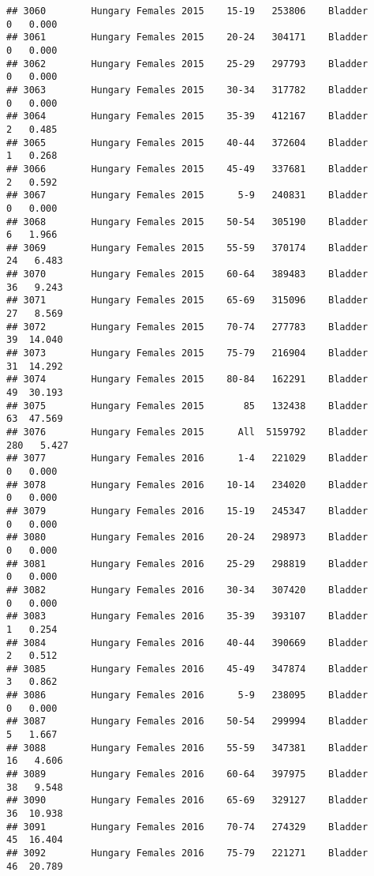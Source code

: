 \documentclass[
]{article}
\begin{document}
\begin{verbatim}
## 3060        Hungary Females 2015    15-19   253806    Bladder      0   0.000
## 3061        Hungary Females 2015    20-24   304171    Bladder      0   0.000
## 3062        Hungary Females 2015    25-29   297793    Bladder      0   0.000
## 3063        Hungary Females 2015    30-34   317782    Bladder      0   0.000
## 3064        Hungary Females 2015    35-39   412167    Bladder      2   0.485
## 3065        Hungary Females 2015    40-44   372604    Bladder      1   0.268
## 3066        Hungary Females 2015    45-49   337681    Bladder      2   0.592
## 3067        Hungary Females 2015      5-9   240831    Bladder      0   0.000
## 3068        Hungary Females 2015    50-54   305190    Bladder      6   1.966
## 3069        Hungary Females 2015    55-59   370174    Bladder     24   6.483
## 3070        Hungary Females 2015    60-64   389483    Bladder     36   9.243
## 3071        Hungary Females 2015    65-69   315096    Bladder     27   8.569
## 3072        Hungary Females 2015    70-74   277783    Bladder     39  14.040
## 3073        Hungary Females 2015    75-79   216904    Bladder     31  14.292
## 3074        Hungary Females 2015    80-84   162291    Bladder     49  30.193
## 3075        Hungary Females 2015       85   132438    Bladder     63  47.569
## 3076        Hungary Females 2015      All  5159792    Bladder    280   5.427
## 3077        Hungary Females 2016      1-4   221029    Bladder      0   0.000
## 3078        Hungary Females 2016    10-14   234020    Bladder      0   0.000
## 3079        Hungary Females 2016    15-19   245347    Bladder      0   0.000
## 3080        Hungary Females 2016    20-24   298973    Bladder      0   0.000
## 3081        Hungary Females 2016    25-29   298819    Bladder      0   0.000
## 3082        Hungary Females 2016    30-34   307420    Bladder      0   0.000
## 3083        Hungary Females 2016    35-39   393107    Bladder      1   0.254
## 3084        Hungary Females 2016    40-44   390669    Bladder      2   0.512
## 3085        Hungary Females 2016    45-49   347874    Bladder      3   0.862
## 3086        Hungary Females 2016      5-9   238095    Bladder      0   0.000
## 3087        Hungary Females 2016    50-54   299994    Bladder      5   1.667
## 3088        Hungary Females 2016    55-59   347381    Bladder     16   4.606
## 3089        Hungary Females 2016    60-64   397975    Bladder     38   9.548
## 3090        Hungary Females 2016    65-69   329127    Bladder     36  10.938
## 3091        Hungary Females 2016    70-74   274329    Bladder     45  16.404
## 3092        Hungary Females 2016    75-79   221271    Bladder     46  20.789

\end{verbatim}
\end{document}
